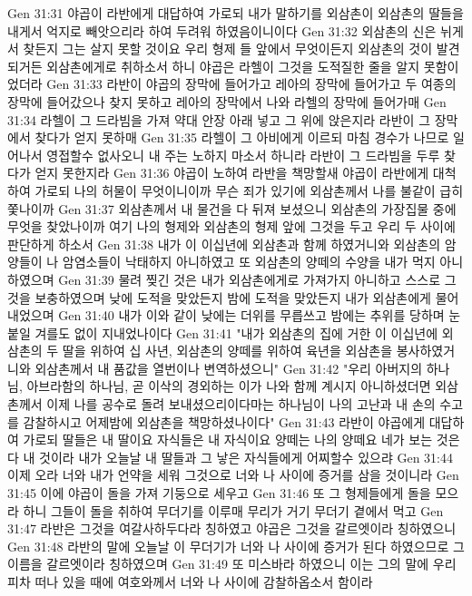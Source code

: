 Gen 31:31  야곱이 라반에게 대답하여 가로되 내가 말하기를 외삼촌이 외삼촌의 딸들을 내게서 억지로 빼앗으리라 하여 두려워 하였음이니이다
Gen 31:32  외삼촌의 신은 뉘게서 찾든지 그는 살지 못할 것이요 우리 형제 들 앞에서 무엇이든지 외삼촌의 것이 발견되거든 외삼촌에게로 취하소서 하니 야곱은 라헬이 그것을 도적질한 줄을 알지 못함이었더라
Gen 31:33  라반이 야곱의 장막에 들어가고 레아의 장막에 들어가고 두 여종의 장막에 들어갔으나 찾지 못하고 레아의 장막에서 나와 라헬의 장막에 들어가매
Gen 31:34  라헬이 그 드라빔을 가져 약대 안장 아래 넣고 그 위에 앉은지라 라반이 그 장막에서 찾다가 얻지 못하매
Gen 31:35  라헬이 그 아비에게 이르되 마침 경수가 나므로 일어나서 영접할수 없사오니 내 주는 노하지 마소서 하니라 라반이 그 드라빔을 두루 찾다가 얻지 못한지라
Gen 31:36  야곱이 노하여 라반을 책망할새 야곱이 라반에게 대척하여 가로되 나의 허물이 무엇이니이까 무슨 죄가 있기에 외삼촌께서 나를 불같이 급히 쫓나이까
Gen 31:37  외삼촌께서 내 물건을 다 뒤져 보셨으니 외삼촌의 가장집물 중에무엇을 찾았나이까 여기 나의 형제와 외삼촌의 형제 앞에 그것을 두고 우리 두 사이에 판단하게 하소서
Gen 31:38  내가 이 이십년에 외삼촌과 함께 하였거니와 외삼촌의 암양들이 나 암염소들이 낙태하지 아니하였고 또 외삼촌의 양떼의 수양을 내가 먹지 아니하였으며
Gen 31:39  물려 찢긴 것은 내가 외삼촌에게로 가져가지 아니하고 스스로 그것을 보충하였으며 낮에 도적을 맞았든지 밤에 도적을 맞았든지 내가 외삼촌에게 물어 내었으며
Gen 31:40  내가 이와 같이 낮에는 더위를 무릅쓰고 밤에는 추위를 당하며 눈붙일 겨를도 없이 지내었나이다
Gen 31:41  "내가 외삼촌의 집에 거한 이 이십년에 외삼촌의 두 딸을 위하여 십 사년, 외삼촌의 양떼를 위하여 육년을 외삼촌을 봉사하였거니와 외삼촌께서 내 품값을 열번이나 변역하셨으니"
Gen 31:42  "우리 아버지의 하나님, 아브라함의 하나님, 곧 이삭의 경외하는 이가 나와 함께 계시지 아니하셨더면 외삼촌께서 이제 나를 공수로 돌려 보내셨으리이다마는 하나님이 나의 고난과 내 손의 수고를 감찰하시고 어제밤에 외삼촌을 책망하셨나이다"
Gen 31:43  라반이 야곱에게 대답하여 가로되 딸들은 내 딸이요 자식들은 내 자식이요 양떼는 나의 양떼요 네가 보는 것은 다 내 것이라 내가 오늘날 내 딸들과 그 낳은 자식들에게 어찌할수 있으랴
Gen 31:44  이제 오라 너와 내가 언약을 세워 그것으로 너와 나 사이에 증거를 삼을 것이니라
Gen 31:45  이에 야곱이 돌을 가져 기둥으로 세우고
Gen 31:46  또 그 형제들에게 돌을 모으라 하니 그들이 돌을 취하여 무더기를 이루매 무리가 거기 무더기 곁에서 먹고
Gen 31:47  라반은 그것을 여갈사하두다라 칭하였고 야곱은 그것을 갈르엣이라 칭하였으니
Gen 31:48  라반의 말에 오늘날 이 무더기가 너와 나 사이에 증거가 된다 하였으므로 그 이름을 갈르엣이라 칭하였으며
Gen 31:49  또 미스바라 하였으니 이는 그의 말에 우리 피차 떠나 있을 때에 여호와께서 너와 나 사이에 감찰하옵소서 함이라
